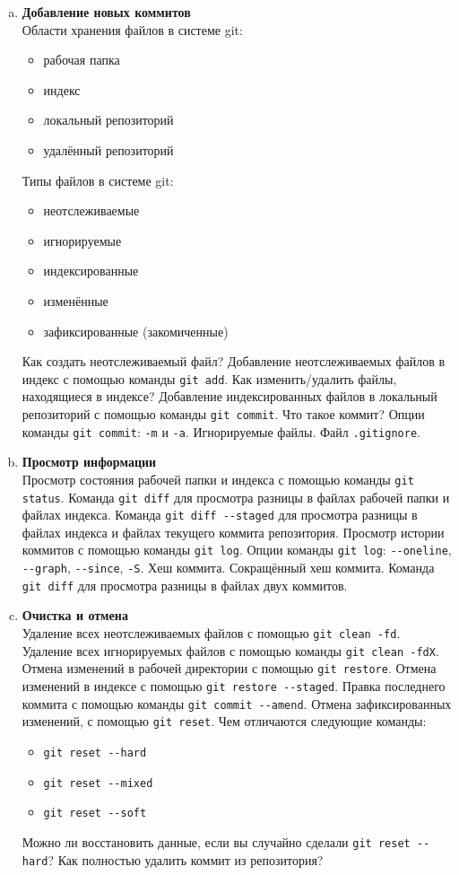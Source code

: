 \documentclass{article}
\begin{document}
\begin{enumerate}
\begin{enumerate}[a.]
\item \textbf{Добавление новых коммитов}\\
Области хранения файлов в системе git:
\begin{itemize}
\item рабочая папка
\item индекс
\item локальный репозиторий
\item удалённый репозиторий
\end{itemize}

Типы файлов в системе git:
\begin{itemize}
\item неотслеживаемые
\item игнорируемые
\item индексированные
\item изменённые
\item зафиксированные (закомиченные)
\end{itemize}

Как создать неотслеживаемый файл?
Добавление неотслеживаемых файлов в индекс с помощью команды \texttt{git add}. 
Как изменить/удалить файлы, находящиеся в индексе?
Добавление индексированных файлов в локальный репозиторий с помощью команды \texttt{git commit}.
Что такое коммит?
Опции команды \texttt{git commit}: \texttt{-m} и \texttt{-a}.
Игнорируемые файлы. Файл \texttt{.gitignore}.

\item \textbf{Просмотр информации}\\
Просмотр состояния рабочей папки и индекса с помощью команды \texttt{git status}.
Команда \texttt{git diff} для просмотра разницы в файлах рабочей папки и файлах индекса.
Команда \texttt{git diff -{}-staged} для просмотра разницы в файлах индекса и файлах текущего коммита репозитория.
Просмотр истории коммитов с помощью команды \texttt{git log}. Опции команды \texttt{git log}: \texttt{-{}-oneline}, \texttt{-{}-graph}, \texttt{-{}-since}, \texttt{-S}. Хеш коммита. Сокращённый хеш коммита. Команда \texttt{git diff} для просмотра разницы в файлах двух коммитов.

\item \textbf{Очистка и отмена}\\
Удаление всех неотслеживаемых файлов с помощью \texttt{git clean -fd}.
Удаление всех игнорируемых файлов с помощью команды \texttt{git clean -fdX}.
Отмена изменений в рабочей директории с помощью \texttt{git restore}. 
Отмена изменений в индексе с помощью \texttt{git restore -{}-staged}.
Правка последнего коммита с помощью команды \texttt{git commit -{}-amend}. 
Отмена зафиксированных изменений, с помощью \texttt{git reset}.
\newpage
Чем отличаются следующие команды:
\begin{itemize}
\item \texttt{git reset -{}-hard}
\item \texttt{git reset -{}-mixed}
\item \texttt{git reset -{}-soft}
\end{itemize}
Можно ли восстановить данные, если вы случайно сделали \texttt{git reset -{}-hard}? 
Как полностью удалить коммит из репозитория?


\end{enumerate}
\end{enumerate}
\end{document}
